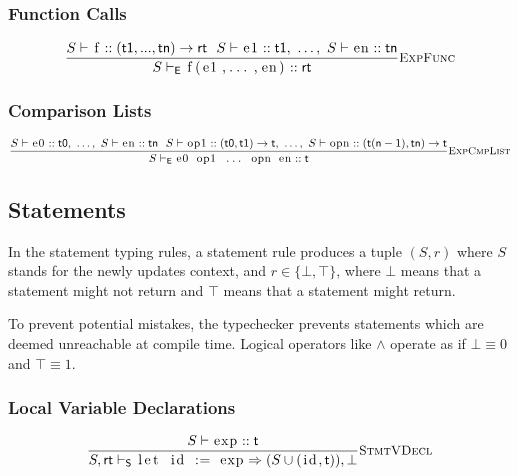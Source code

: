 \documentclass{article}
\newcommand{\code}[1]{\lstinline[columns=fixed]{#1}}
\newcommand{\drmrule}[5]{\frac{#1}{#2\vdash_{\mathsf{#3}}#4}\textsc{\small{#5}}}
\begin{document}
			\subsubsection{Function Calls}
			
				\begin{align*}
					\drmrule{S\vdash\textnormal{\code{f}} :: \mathsf{(t1,...,tn) \to rt}\ \ S\vdash\textnormal{\code{e1}} :: \mathsf{t1},\ \dots,\ S\vdash\textnormal{\code{en}} :: \mathsf{tn}}{S}{E}{\textnormal{\code{f(e1,...,en)}} :: \mathsf{rt}}{ExpFunc}
				\end{align*}
			
			\subsubsection{Comparison Lists}
			
				\begin{align*}
					\drmrule{S\vdash\textnormal{\code{e0}} :: \mathsf{t0},\ \dots,\ S\vdash\textnormal{\code{en}} :: \mathsf{tn}\ \ S\vdash\textnormal{\code{op1}} :: \mathsf{(t0,t1) \to t},\ \dots,\ S\vdash\textnormal{\code{opn}} :: \mathsf{(t(n-1),tn) \to t}}{S}{E}{\textnormal{\code{e0 op1 ... opn en}} :: \mathsf{t}}{ExpCmpList}
				\end{align*}
				
		\subsection{Statements}
		
			In the statement typing rules, a statement rule produces a tuple $(S,r)$ where $S$ stands for the newly updates context, and $r\in\{\bot,\top\}$, where $\bot$ means that a statement might not return and $\top$ means that a statement might return.
			
			To prevent potential mistakes, the typechecker prevents statements which are deemed unreachable at compile time. Logical operators like $\wedge$ operate as if $\bot\equiv0$ and $\top\equiv1$.
		
			\subsubsection{Local Variable Declarations}
			
				\begin{align*}
					\drmrule{S\vdash\textnormal{\code{exp}} :: \mathsf{t}}{S,\mathsf{rt}}{S}{\textnormal{\code{let id := exp}} \Rightarrow (S \cup (\textnormal{\code{id}},\mathsf{t})),\bot}{StmtVDecl}
				\end{align*}
			
\end{document}
